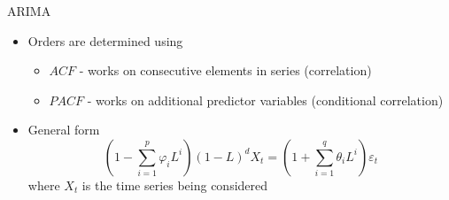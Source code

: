 \documentclass[11pt,compress,aspectratio=1610]{beamer}
\begin{document}
\begin{frame}{ARIMA}
{\begin{itemize}
\begin{itemize}
                $\rightarrow$ Used to remove the trend - makes the series stationary
        \item q - Moving average \\
                $\rightarrow$ Dependence on past error
    \end{itemize}
    \item Orders are determined using
	    \begin{itemize}
	        \item $ACF$ - works on consecutive elements in series (correlation)
	        \item $PACF$ - works on additional predictor variables (conditional correlation)
	    \end{itemize}
    \item General form
        \begin{equation*}
            \left( 1 - \sum_{i=1}^{p} \varphi_i L^i \right) (1-L)^d X_t = \left( 1 + \sum_{i=1}^{q} \theta_i L^i \right) \varepsilon_t
        \end{equation*}
        where $X_t$ is the time series being considered\\
\end{itemize}
}
\end{frame}
\end{document}
